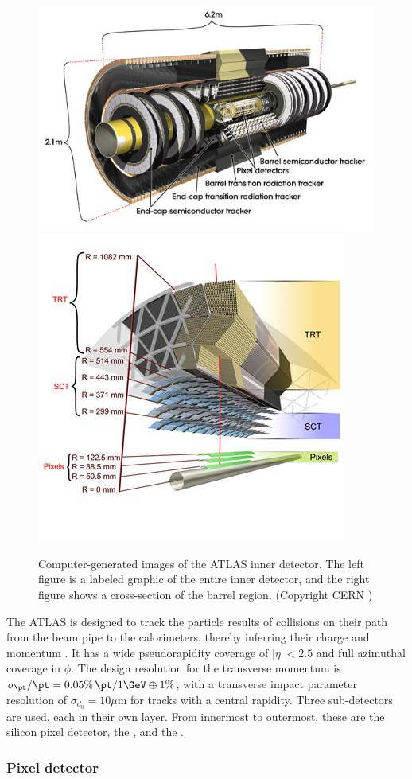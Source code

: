 \begin{figure}[t]
\includegraphics[width=0.57\linewidth]{id_whole.jpg}
\includegraphics[width=0.42\linewidth]{id_slice.jpg}
\caption{Computer-generated images of the ATLAS inner detector. The left figure is a labeled graphic of the entire inner detector, and the right figure shows a cross-section of the barrel region. (Copyright CERN \cite{Pequenao:1095926})}
\label{fig:atlas_id}
\end{figure}

The ATLAS \id is designed to track the particle results of collisions on their path from the beam pipe to the calorimeters, thereby inferring their charge and momentum \cite{ATLAS:1997ag,ATLAS:1997af,Aad:2010bx}.
It has a wide pseudorapidity coverage of \(\left| \eta \right| < 2.5\) and full azimuthal coverage in $\phi$.
The design resolution for the transverse momentum is \( \sigma_{\pt}/\pt = 0.05\% \, \pt /1 \GeV \oplus 1\% \), with a transverse impact parameter resolution of \( \sigma_{d_0} = 10 \mu\textrm{m}\) for tracks with a central rapidity.
Three sub-detectors are used, each in their own layer.
From innermost to outermost, these are the silicon pixel detector, the \sct, and the \trt.


\subsubsection{Pixel detector}

